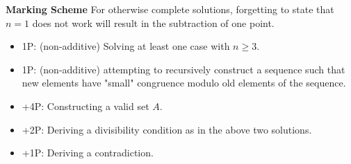 \textbf{Marking Scheme}
For otherwise complete solutions, forgetting to state that $n=1$ does not work will result in the subtraction of one point.
\begin{itemize}
    \item 1P: (non-additive) Solving at least one case with $n\geq 3$.
    \item 1P: (non-additive) attempting to recursively construct a sequence such that new elements have "small" congruence modulo old elements of the sequence.
    \item +4P: Constructing a valid set $A$.
    \item +2P: Deriving a divisibility condition as in the above two solutions.
    \item +1P: Deriving a contradiction.
\end{itemize}